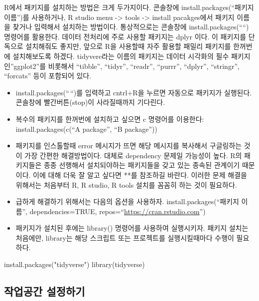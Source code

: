 \documentclass[
]{book}
\newenvironment{Shaded}{\begin{snugshade}}{\end{snugshade}}
\newcommand{\FunctionTok}[1]{\textcolor[rgb]{0.00,0.00,0.00}{#1}}
\newcommand{\NormalTok}[1]{#1}
\newcommand{\StringTok}[1]{\textcolor[rgb]{0.31,0.60,0.02}{#1}}
\providecommand{\tightlist}{%
  \setlength{\itemsep}{0pt}\setlength{\parskip}{0pt}}
\theoremstyle{definition}
\theoremstyle{definition}
\theoremstyle{definition}
\theoremstyle{definition}
\theoremstyle{remark}
\begin{document}
R에서 패키지를 설치하는 방법은 크게 두가지이다. 콘솔창에 install.packages(``패키지 이름'')를 사용하거나, R studio menu -\textgreater{} tools -\textgreater{} install pacakges에서 패키지 이름을 찾거나 입력해서 설치하는 방법이다. 통상적으로는 콘솔창에 install.packages(````) 명령어를 활용한다.
데이터 전처리에 주로 사용할 패키지는 dplyr 이다. 이 패키지를 단독으로 설치해줘도 좋지만, 앞으로 R을 사용할때 자주 활용할 패밀리 패키지를 한꺼번에 설치해보도록 하겠다. tidyvere라는 이름의 패키지는 데이터 시각화의 필수 패키지인''ggplot2''를 비롯해서 ``tibble'', ``tidyr'', ``readr'', ``purrr'', ``dplyr'', ``stringr'', ``forcats'' 등이 포함되어 있다.

\begin{itemize}
\tightlist
\item
  install.packages(``\,``)를 입력하고 cntrl+R을 누르면 자동으로 패키지가 실행된다. 콘솔창에 빨간버튼(stop)이 사라질때까지 기다린다.
\item
  복수의 패키지를 한꺼번에 설치하고 싶으면 c 명령어를 이용한다: install.packages(c(``A package'', ``B package''))
\item
  패키지를 인스톨할때 error 메시지가 뜨면 해당 메시지를 복사해서 구글링하는 것이 가장 간편한 해결방법이다. 대체로 dependency 문제일 가능성이 높다. R의 패키지들은 종종 선행해서 설치되야하는 패키지들을 갖고 있는 종속된 관계이기 때문이다. 이에 대해 더욱 잘 알고 싶다면 **를 참조하길 바란다. 이러한 문제 해결을 위해서는 처음부터 R, R studio, R tools 설치를 꼼꼼히 하는 것이 필요하다.
\item
  급하게 해결하기 위해서는 다음의 옵션을 사용하자.
  install.packages(``패키지 이름'', dependencies=TRUE, repos=``\url{https://cran.rstudio.com}'')
\item
  패키지가 설치된 후에는 library() 명령어를 사용하여 실행시키자. 패키지 설치는 처음에만, library는 해당 스크립트 또는 프로젝트를 실행시킬때마다 수행이 필요하다.
\end{itemize}

\begin{Shaded}
\begin{Highlighting}[]
\FunctionTok{install.packages}\NormalTok{(}\StringTok{"tidyverse"}\NormalTok{)}
\FunctionTok{library}\NormalTok{(tidyverse)}
\end{Highlighting}
\end{Shaded}

\hypertarget{uxc791uxc5c5uxacf5uxac04-uxc124uxc815uxd558uxae30}{%
\subsection{작업공간 설정하기}\label{uxc791uxc5c5uxacf5uxac04-uxc124uxc815uxd558uxae30}}
\end{document}
